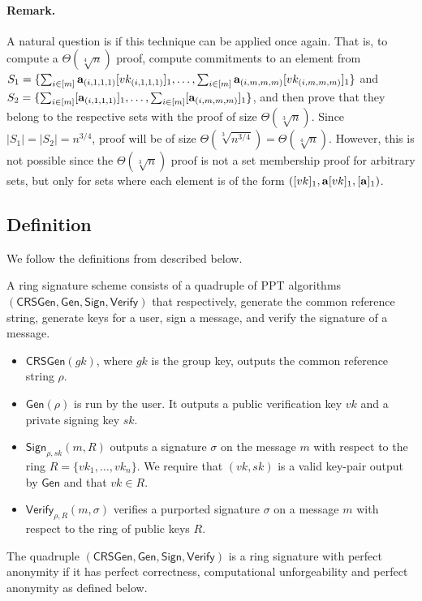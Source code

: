 \paragraph{Remark.}
A natural question is if this technique can be applied once again. That is, to compute a $\Theta(\sqrt[4]{n})$  proof, compute commitments to an element from $S_1=\{\sum_{i\in[m]}\mathbf{a}_{(i,1,1,1)}[vk_{(i,1,1,1)}]_1,\ldots,\sum_{i\in[m]}\mathbf{a}_{(i,m,m,m)}[vk_{(i,m,m,m)}]_1\}$ and $S_2=\allowbreak\{\sum_{i\in[m]}[\mathbf{a}_{(i,1,1,1)}]_1,\ldots,\sum_{i\in[m]}[\mathbf{a}_{(i,m,m,m)}]_1\}$, and then prove that they belong to the respective sets with the proof of size $\Theta(\sqrt[3]{n})$. Since $|S_1|=|S_2|=n^{3/4}$, proof will be of size $\Theta(\sqrt[3]{n^{3/4}})=\Theta(\sqrt[4]{n})$. However, this is not possible since the $\Theta(\sqrt[3]{n})$ proof is not a set membership proof for arbitrary sets, but only for sets where each element is of the form $([vk]_1,\mathbf{a}[vk]_1,[\mathbf{a}]_1)$.

\subsection{Definition}
We follow the definitions from \cite{ICALP:ChaGroSah07} described below.

\begin{definition}
A ring signature scheme consists of a quadruple of
PPT algorithms $(\mathsf{CRSGen}, \mathsf{Gen}, \mathsf{Sign}, \mathsf{Verify})$ that respectively, generate the common
reference string, generate keys for a user, sign a message, and verify the signature of a
message.
\begin{itemize}
\item $\mathsf{CRSGen}(gk)$, where $gk$ is the group key, outputs the common reference
string $\rho$.
\item $\mathsf{Gen}(\rho)$ is run by the user. It outputs a public verification key $vk$ and a private
signing key $sk$.
\item $\mathsf{Sign}_{\rho,sk}(m, R)$ outputs a signature $\sigma$ on the message $m$ with respect to the ring
$R = \{vk_1,\ldots,vk_n\}$. We require that $(vk, sk)$ is a valid key-pair output by $\mathsf{Gen}$
and that $vk \in R$.
\item $\mathsf{Verify}_{\rho,R}(m, \sigma)$ verifies a purported signature $\sigma$ on a message $m$ with respect to
the ring of public keys $R$.
\end{itemize}
The quadruple $(\mathsf{CRSGen}, \mathsf{Gen}, \mathsf{Sign}, \mathsf{Verify})$ is a ring signature with perfect
anonymity if it has perfect correctness, computational unforgeability and perfect
anonymity as defined below.
\end{definition}

